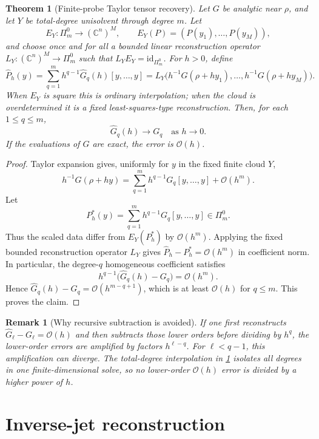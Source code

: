 \documentclass[11pt]{article}
\newtheorem{theorem}[definition]{Theorem}
\newtheorem{remark}[definition]{Remark}
\newcommand{\C}{\mathbb C}
\newcommand{\Oterm}{\mathcal O}
\begin{document}
\begin{theorem}[Finite-probe Taylor tensor recovery]\label{thm:tensor-recovery}
Let \(G\) be analytic near \(\rho\), and let \(Y\) be total-degree unisolvent through degree \(m\). Let
\[
        E_Y:\Pi_m^0\to(\C^n)^M,
        \qquad E_Y(P)=(P(y_1),\ldots,P(y_M)),
\]
and choose once and for all a bounded linear reconstruction operator
\(L_Y:(\C^n)^M\to\Pi_m^0\) such that \(L_YE_Y=\mathrm{id}_{\Pi_m^0}\).
For \(h>0\), define
\[
        \widehat P_h(y)=\sum_{q=1}^m h^{q-1}\widehat G_q(h)[y,\ldots,y]
        =L_Y\bigl(h^{-1}G(\rho+h y_1),\ldots,h^{-1}G(\rho+h y_M)\bigr).
\]
When \(E_Y\) is square this is ordinary interpolation; when the cloud is overdetermined it is a fixed least-squares-type reconstruction. Then, for each \(1\le q\le m\),
\[
        \widehat G_q(h)\to G_q
        \quad\text{as }h\to0.
\]
If the evaluations of \(G\) are exact, the error is \(\Oterm(h)\).
\end{theorem}

\begin{proof}
Taylor expansion gives, uniformly for \(y\) in the fixed finite cloud \(Y\),
\[
        h^{-1}G(\rho+h y)
        =
        \sum_{q=1}^{m}h^{q-1}G_q[y,\ldots,y]
        +\Oterm(h^m).
\]
Let
\[
        P_h^*(y)=\sum_{q=1}^{m}h^{q-1}G_q[y,\ldots,y]\in\Pi_m^0.
\]
Thus the scaled data differ from \(E_Y(P_h^*)\) by \(\Oterm(h^m)\). Applying the fixed bounded reconstruction operator \(L_Y\) gives \(\widehat P_h-P_h^*=\Oterm(h^m)\) in coefficient norm. In particular, the degree-\(q\) homogeneous coefficient satisfies
\[
        h^{q-1}\bigl(\widehat G_q(h)-G_q\bigr)=\Oterm(h^m).
\]
Hence \(\widehat G_q(h)-G_q=\Oterm(h^{m-q+1})\), which is at least \(\Oterm(h)\) for \(q\le m\). This proves the claim.
\end{proof}

\begin{remark}[Why recursive subtraction is avoided]
If one first reconstructs \(\widehat G_\ell-G_\ell=\Oterm(h)\) and then subtracts those lower orders before dividing by \(h^q\), the lower-order errors are amplified by factors \(h^{\ell-q}\). For \(\ell<q-1\), this amplification can diverge. The total-degree interpolation in \cref{thm:tensor-recovery} isolates all degrees in one finite-dimensional solve, so no lower-order \(\Oterm(h)\) error is divided by a higher power of \(h\).
\end{remark}

\section{Inverse-jet reconstruction}
\end{document}

